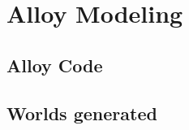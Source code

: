 \section{Alloy Modeling} \label{sec:alloy}

\subsection{Alloy Code} \label{code}

\subsection{Worlds generated} \label{world}